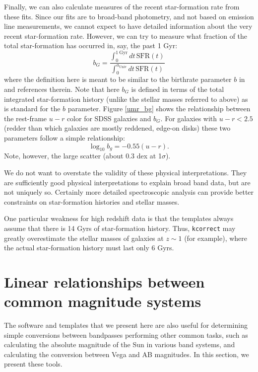 \documentclass[10pt,preprint]{aastex}
\begin{document}
Finally, we can also calculate measures of the recent star-formation
rate from these fits. Since our fits are to broad-band photometry, and
not based on emission line measurements, we cannot expect to have
detailed information about the very recent star-formation
rate. However, we can try to measure what fraction of the total
star-formation has occurred in, say, the past 1 Gyr:
\begin{equation}
b_{G} = \frac{\int_0^{1\mathrm{~Gyr}} dt\, \mathrm{SFR}(t)}
{\int_0^{a_{\mathrm{Univ}}} dt\, \mathrm{SFR}(t)}
\end{equation}
where the definition here is meant to be similar to the birthrate
parameter $b$ in \citet{kennicutt94a} and references therein.  Note
that here $b_G$ is defined in terms of the total integrated
star-formation history (unlike the stellar masses referred to above)
as is standard for the $b$ parameter. Figure \ref{umr_bg} shows the
relationship between the rest-frame $u-r$ color for SDSS galaxies and
$b_G$. For galaxies with $u-r < 2.5$ (redder than which galaxies are
mostly reddened, edge-on disks) these two parameters follow a simple
relationship:
\begin{equation}
\log_{10} b_g = -0.55 (u-r). 
\end{equation}
Note, however, the large scatter (about 0.3 dex at 1$\sigma$). 

We do not want to overstate the validity of these physical
interpretations. They are sufficiently good physical interpretations
to explain broad band data, but are not uniquely so. Certainly more
detailed spectroscopic analysis can provide better constraints on
star-formation histories and stellar masses. 

One particular weakness for high redshift data is that the templates
always assume that there is 14 Gyrs of star-formation history.  Thus,
{\tt kcorrect} may greatly overestimate the stellar masses of galaxies
at $z \sim 1$ (for example), where the actual star-formation history
must last only 6 Gyrs.

\section{Linear relationships between common magnitude systems}
\label{sdss2bessell}

The software and templates that we present here are also useful for
determining simple conversions between bandpasses performing other
common tasks, such as calculating the absolute magnitude of the Sun in
various band systems, and calculating the conversion between Vega and
AB magnitudes. In this section, we present these tools.
\end{document}
